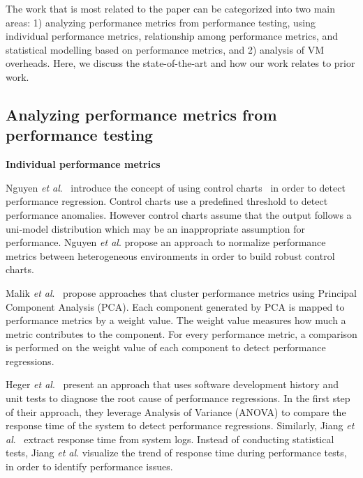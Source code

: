 The work that is most related to the paper can be categorized into two main areas: 1) analyzing performance metrics from performance testing, using individual performance metrics, relationship among performance metrics, and statistical modelling based on performance metrics, and 2) analysis of VM overheads. Here, we discuss the state-of-the-art and how our work relates to prior work.

\subsection{Analyzing performance metrics from performance testing} 

\noindent \textbf{Individual performance metrics}

Nguyen \textit{et al$.$}~\cite{Nguyen:2012:ADP:2188286.2188344} introduce the concept of using control charts~\cite{shewhart1931economic} in order to detect performance regression. Control charts use a predefined threshold to detect performance anomalies. However control charts assume that the output follows a uni-model distribution which may be an inappropriate assumption for performance. Nguyen \textit{ et al$.$} propose an approach to normalize performance metrics between heterogeneous environments in order to build robust control charts. %

Malik \emph{et al$.$}~\cite{Malik:2010:ACL:1955601.1955936, haroon} propose approaches that cluster performance metrics using Principal Component Analysis (PCA). Each component generated by PCA is mapped to performance metrics by a weight value. The weight value measures how much a metric contributes to the component. For every performance metric, a comparison is performed on the weight value of each component to detect performance regressions.

Heger \emph{et al$.$}~\cite{DBLP:conf/wosp/HegerHF13} present an approach that uses software development history and unit tests to diagnose the root cause of performance regressions. In the first step of their approach, they leverage Analysis of Variance (ANOVA) to compare the response time of the system to detect performance regressions. Similarly, Jiang \emph{et al$.$}~\cite{jackicsm2009} extract response time from system logs. Instead of conducting statistical tests, Jiang \emph{et al$.$} visualize the trend of response time during performance tests, in order to identify performance issues.


